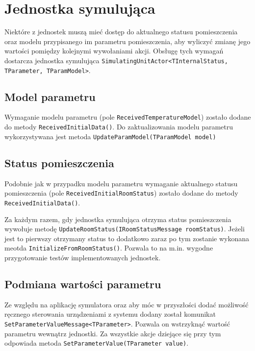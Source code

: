 \section{Jednostka symulująca} \label{subsec:simUnit}
Niektóre z jednostek muszą mieć dostęp do aktualnego statusu pomieszczenia oraz modelu przypisanego im parametru pomieszczenia, aby wyliczyć zmianę jego wartości pomiędzy kolejnymi wywołaniami akcji. Obsługę tych wymagań dostarcza jednostka symulująca \lstinline{SimulatingUnitActor<TInternalStatus, TParameter, TParamModel>}.

\subsection*{Model parametru}
Wymaganie modelu parametru (pole \lstinline{ReceivedTemperatureModel}) zostało dodane do metody \lstinline{ReceivedInitialData()}.
Do zaktualizowania modelu parametru wykorzystywana jest metoda \lstinline{UpdateParamModel(TParamModel model)}

\subsection*{Status pomieszczenia}
Podobnie jak w przypadku modelu parametru wymaganie aktualnego statusu pomieszczenia (pole \lstinline{ReceivedInitialRoomStatus}) zostało dodane do metody \lstinline{ReceivedInitialData()}.

Za każdym razem, gdy jednostka symulująca otrzyma status pomieszczenia wywołuje metodę \lstinline{UpdateRoomStatus(IRoomStatusMessage roomStatus)}.
Jeżeli jest to pierwszy otrzymany status to dodatkowo zaraz po tym zostanie wykonana meotda \lstinline{InitializeFromRoomStatus()}. Pozwala to na m.in. wygodne przygotowanie testów implementowanych jednostek. 

\subsection{Podmiana wartości parametru}
Ze względu na aplikację symulatora oraz aby móc w przyszłości dodać możliwość ręcznego sterowania urządzeniami z systemu dodany został komunikat \lstinline{SetParameterValueMessage<TParameter>}. Pozwala on wstrzyknąć wartość parametru wewnątrz jednostki. Za wszystkie akcje dziejące się przy tym odpowiada metoda \lstinline{SetParameterValue(TParameter value)}.